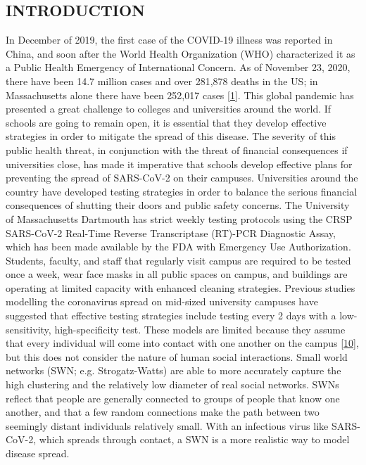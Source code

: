 \documentclass[fullpage]{extarticle}
\begin{document}
\begin{center}
\section{INTRODUCTION}
\label{sec:intro}
\end{center}

\begin{large}
\begin{flushleft}
In December of 2019, the first case of the COVID-19 illness was reported in China, and soon after the World Health Organization (WHO) characterized it as a Public Health Emergency of International Concern. As of November 23, 2020, there have been 14.7 million cases and over 281,878 deaths in the US; in Massachusetts alone there have been 252,017 cases [\hyperref[ref:1]{1}]. This global pandemic has presented a great challenge to colleges and universities around the world.  If schools are going to remain open, it is essential that they develop effective strategies in order to mitigate the spread of this disease. The severity of this public health threat, in conjunction with the threat of financial consequences if universities close, has made it imperative that schools develop effective plans for preventing the spread of SARS-CoV-2 on their campuses.\bigbreak
Universities around the country have developed testing strategies in order to balance the serious financial consequences of shutting their doors and public safety concerns. The University of Massachusetts Dartmouth has strict weekly testing protocols using the CRSP SARS-CoV-2 Real-Time Reverse Transcriptase (RT)-PCR Diagnostic Assay, which has been made available by the FDA with Emergency Use Authorization. Students, faculty, and staff that regularly visit campus are required to be tested once a week, wear face masks in all public spaces on campus, and buildings are operating at limited capacity with enhanced cleaning strategies.\bigbreak
Previous studies modelling the coronavirus spread on mid-sized university campuses have suggested that effective testing strategies include testing every 2 days with a low-sensitivity, high-specificity test. These models are limited because they assume that every individual will come into contact with one another on the campus [\hyperref[ref:10]{10}], but this does not consider the nature of human social interactions. Small world networks (SWN; e.g. Strogatz-Watts) are able to more accurately capture the high clustering and the relatively low diameter of real social networks. SWNs reflect that people are generally connected to groups of people that know one another, and that a few random connections make the path between two seemingly distant individuals relatively small. With an infectious virus like SARS-CoV-2, which spreads through contact, a SWN is a more realistic way to model disease spread.\bigbreak

\end{flushleft}
\end{large}
\end{document}
